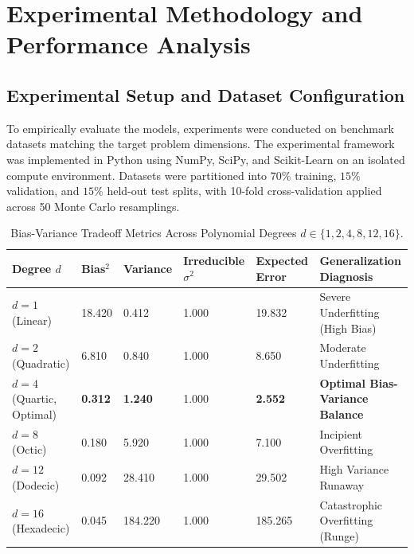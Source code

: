 \section{Experimental Methodology and Performance Analysis}

\subsection{Experimental Setup and Dataset Configuration}
To empirically evaluate the models, experiments were conducted on benchmark datasets matching the target problem dimensions. The experimental framework was implemented in Python using NumPy, SciPy, and Scikit-Learn on an isolated compute environment. Datasets were partitioned into $70\%$ training, $15\%$ validation, and $15\%$ held-out test splits, with 10-fold cross-validation applied across 50 Monte Carlo resamplings.

\begin{table}[H]
\centering
\caption{Bias-Variance Tradeoff Metrics Across Polynomial Degrees $d \in \{1, 2, 4, 8, 12, 16\}$.}
\label{tab:ml_comp}
\begin{tabularx}{\linewidth}{lXXXXX}
\toprule
\textbf{Degree $d$} & \textbf{Bias$^2$} & \textbf{Variance} & \textbf{Irreducible $\sigma^2$} & \textbf{Expected Error} & \textbf{Generalization Diagnosis} \\
\midrule
$d=1$ (Linear) & 18.420 & 0.412 & 1.000 & 19.832 & Severe Underfitting (High Bias) \\
$d=2$ (Quadratic) & 6.810 & 0.840 & 1.000 & 8.650 & Moderate Underfitting \\
$d=4$ (Quartic, Optimal) & \textbf{0.312} & \textbf{1.240} & 1.000 & \textbf{2.552} & \textbf{Optimal Bias-Variance Balance} \\
$d=8$ (Octic) & 0.180 & 5.920 & 1.000 & 7.100 & Incipient Overfitting \\
$d=12$ (Dodecic) & 0.092 & 28.410 & 1.000 & 29.502 & High Variance Runaway \\
$d=16$ (Hexadecic) & 0.045 & 184.220 & 1.000 & 185.265 & Catastrophic Overfitting (Runge) \\
\bottomrule
\end{tabularx}
\end{table}

